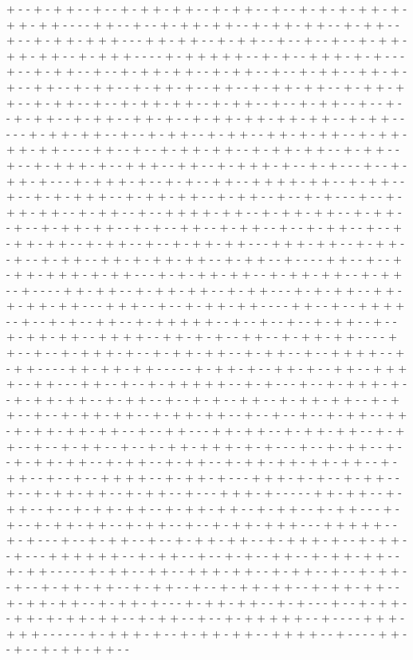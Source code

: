 + - - + - + + - - + - - + - + + - + + - - + - + + - - + - - + - + - + - + + - + - + + - + + - - - - + + - - + - - + - + + - + + - - + - + + - + + - - + - + + - - + - - + - + + - + + + - - - + + - + + - - + - + + - - + - - + - - + - - + - + + - + + - + + - - + - + + + - - - - + - + + + + + - - + - + - - + + + - + - + - - - + - - + - + + - - + - - + - + + - + + - - + - + + - - + - - + - + + - - + + - + - + - - + + - - + - + + - - + - + + - + - - + + - - + - + + - + + - - + - + + - + + - - + - + + - - + - - + - + + - + + - - + - + + - - + - - + - + + - - + - - + - - + - + + - - + - + + - - + + - + - - + - + + - + + - + + - + + - - + - + + - - - - - + - + + - + + - - + - - + - + + - - + - + + - - + + - + - + + - - + - + + - + + - + + - - - - + + - - + - - + - + + - + + - - + - + + - + + - - + - + + - - + - - + - + + + - + - - + + + - - + + - - + - + + + - + - - + - + - - - + - - + - + + - + - - - + - + + + - + - - + - + - - + + - - + + + + - + + - - + - + + - - + - - + - + - + + + - - + - + + - + + - - + - + + - - + - - + - + - - - + - - + - + + - + + - - + - + + - - + - - + + + + - + + - - + - + + - + + - - + - + + - - + - - + - + + - + + - - + - + - - + + - - + - + + - - + - - + - + + - - + - - + - + + - + + - - + - + + - - + - - + - + + - + + - - - + + + - + + - - + - + + - - + - - + - + + - - + + - + - + + - + + - - + - + + - - + - - - - + + - - + - - + - + + - + + + - + - + + - - - + - + - + + - + + - - + - + + - + + - - + - + + - - + - - - - + + - + + - - + - + + - + + - - + - + + - - - + - + - + + - - + + - + - + + - + + - - - + + + - - + - - + - + + - + + - - - - + + - - + - - + + + + - - + - - + - + - - + + - - + - + + + + + - - + - - + - - + - - + - + + - - + - - + - + + - + + - - + + + + - - + + - + - + - - + + - - + - + + - + + - - - - + + - - + - - + - + + + - + - - + - + + - + + - - + - + + - - + - - + + + + - - + - + + - - - - + + - + + - + + - - - - - + - + + - + - - + + - + - - + + - - + + + + - - + + - - - + + - - + - - + - + + + + + - - + - + - - - + - - + - + + + - + - - + - + + - + + - - + - + + - - + - - + - + - - + + - - + - + + - + + - - + - + + - - + - - + - + + - + + - - + - + + - + + - - + - - + - - + - - + - + + - - + + - + - + + - + + - + + - - + - - + + - - - + + - + + - - + - + + - + + - - + - + + - - + - - + - + + - - + - - + - + + - + + + - + - + - - - + - - + - + + - - + - - + - + + - + + - - + - + + - - + - + + - - + - + + - + + - + + - + + - - + - + + - - + - - + - - + + + + - - + - + + - + - - - + + + - + - + - - + - + + - - + - - + - + + - + + - - + - + + - - + - - - + + + - + - - - - - + + - + + - - + - + + - - + - - + - + + - + + - - + - + + - + + - - + - + + - - + - + + - - - + - + - - + - + + - + + - - + - + + - - + - - + - + + - + + + - - - + + + + + - - + - + - - - + - - + - + + - - + - - + - + + - + + - - + - + + + - + - - + - + + - - + - - - + + + + + + - - + - + + - - + - - + - + - - + + - - + - + + - + + - - + - + + - - - - - + - + + - - + + - - + + + - + + - - + - + + - - + - - + - + + - - + - - + - + + - + + - - + - + + - - + - - + - + + - + + - - + - + + - + + - - + - + + - + + - - + - + + - + - - - + - + + - + + - - + - + - - - + - - + - + + - - + + - + - + + - + + - - + - + + - - + - - + - + + + + + - - + - - - - + + + - + + + - - - - - - + - + + + - + - - + - + + - + + - - + + + + - - + - - - - + + - - + - - + - + + - + + - - 